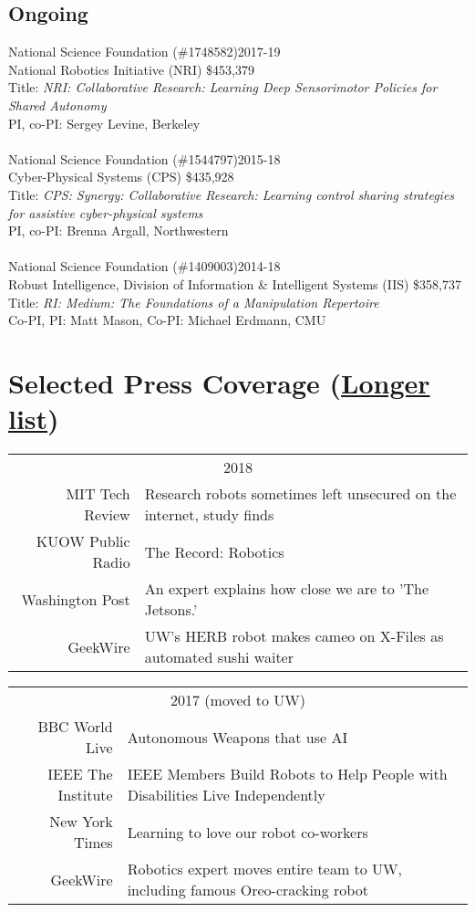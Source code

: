 \documentclass[10pt]{article}
\begin{document}
\subsection{Ongoing}
\noindent
National Science Foundation (\#1748582)\hfill 2017-19\\
National Robotics Initiative (NRI) \hfill \$453,379\\
Title: \textit{NRI: Collaborative Research: Learning Deep Sensorimotor Policies for Shared Autonomy}\\
PI, co-PI: Sergey Levine, Berkeley\\
\\
National Science Foundation (\#1544797)\hfill 2015-18\\
Cyber-Physical Systems (CPS) \hfill \$435,928\\
Title: \textit{CPS: Synergy: Collaborative Research: Learning control sharing strategies for assistive cyber-physical systems}\\
PI, co-PI: Brenna Argall, Northwestern\\
\\
National Science Foundation (\#1409003)\hfill 2014-18\\
Robust Intelligence, Division of Information \& Intelligent Systems (IIS) \hfill \$358,737\\
Title: \textit{RI: Medium: The Foundations of a Manipulation Repertoire}\\
Co-PI, PI: Matt Mason, Co-PI: Michael Erdmann, CMU\\

\section{Selected Press Coverage (\href{https://personalrobotics.cs.washington.edu/press/}{Longer list})}
\begin{tabularx}{\linewidth}{rX}
\multicolumn{2}{c}{2018}\\ 
MIT Tech Review & Research robots sometimes left unsecured on the internet, study finds\\
KUOW Public Radio & The Record: Robotics\\
Washington Post & An expert explains how close we are to 'The Jetsons.'\\
GeekWire & UW’s HERB robot makes cameo on X-Files as automated sushi waiter\\
\end{tabularx}
\begin{tabularx}{\linewidth}{rX}
\multicolumn{2}{c}{2017 (moved to UW)}\\ 
BBC World Live & Autonomous Weapons that use AI\\
IEEE The Institute &  IEEE Members Build Robots to Help People with Disabilities Live Independently\\
New York Times & Learning to love our robot co-workers\\
GeekWire & Robotics expert moves entire team to UW, including famous Oreo-cracking robot\\
\end{tabularx}
\newpage


\end{document}
